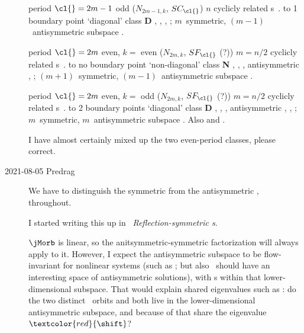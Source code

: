 \begin{description}
period $\cl{}=2m-1$ odd (${N}_{2m-1,k}$, $SC_\cl{}$) $n$
cyclicly related {\lattstate}s
\beq
{}
\,.
to
                1 boundary point `diagonal' class \textbf{D}
                ,
                    ,
                    ,
                    ;
                    $m$\dmn\ symmetric, $(m-1)$\dmn\ antisymmetric subspace
                    .

period $\cl{}=2m$ even, $k=$ even (${N}_{2m,k}$, $SF_\cl{}$ (?)) $m=n/2$
cyclicly related {\lattstate}s
\beq
{}
\,.
to
                {no boundary point} `non-diagonal' class  \textbf{N}
                ,
                ,
                ,
                antisymmetric ,
                ;
                $(m+1)$\dmn\ symmetric, $(m-1)$\dmn\ antisymmetric subspace
                .

period $\cl{}=2m$ even, $k=$ odd (${N}_{2m,k}$, $SF_\cl{}$ (?))  $m=n/2$
cyclicly related {\lattstate}s
\beq
{}
\,.
to
                2 boundary points `diagonal' class \textbf{D}
                ,
                ,
                ,
                antisymmetric ,
                ,
                ;
                $m$\dmn\ symmetric, $m$\dmn\ antisymmetric subspace
                .
                Also and .

I have almost certainly mixed up the two even-period classes, please correct.

\item[2021-08-05 Predrag]
We have to distinguish the
symmetric
from the
antisymmetric
, 
throughout.

I started writing this up in
~{\em Reflection-symmetric {\lattstate}s}.


{\JacobianOrb} $\jMorb$ is linear, so the anitsymmetric-symmetric
factorization will always apply to it. However, I expect the
antisymmetric subspace to be flow-invariant for nonlinear systems
(such as \henlatt; but also \templatt\ should have an interesting space
of antisymmetric solutions), with {\lattstate}s within that
lower-dimensional subspace. That would explain shared eigenvalues such as
:
do the two distinct \Henon\ orbits  and 
both live in the lower-dimensional antisymmetric subspace,
and because of that share the eigenvalue
$\textcolor{red}{\shift}$? %


\end{description}
